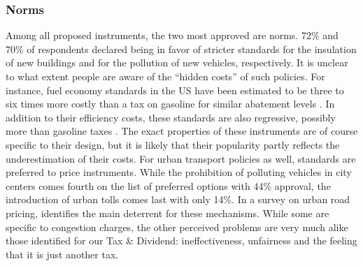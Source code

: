 \documentclass[english,5p,authoryear]{elsarticle}
\begin{document}


        \subsubsection{Norms}

Among all proposed instruments, the two most approved are norms. 72\% and 70\% of respondents declared being in favor of stricter standards for the insulation of new buildings and for the pollution of new vehicles, respectively. It is unclear to what extent people are aware of the ``hidden costs'' of such policies. For instance, fuel economy standards in the US have been estimated to be three to six times more costly than a tax on gasoline for similar abatement levels \citep{jacobsen_2013}. In addition to their efficiency costs, these standards are also regressive, possibly more than gasoline taxes \citep{jacobsen_2013, davis_knittel_2019, levinson_2019}. The exact properties of these instruments are of course specific to their design, but it is likely that their popularity partly reflects the underestimation of their costs.
For urban transport policies as well, standards are preferred to price instruments. While the prohibition of polluting vehicles in city centers comes fourth on the list of preferred options with 44\% approval, the introduction of urban tolls comes last with only 14\%. In a survey on urban road pricing, \citet{jones_1998} identifies the main deterrent for these mechanisms. While some are specific to congestion charges, the other perceived problems are very much alike those identified for our Tax \& Dividend: ineffectiveness, unfairness and the feeling that it is just another tax.
\end{document}
